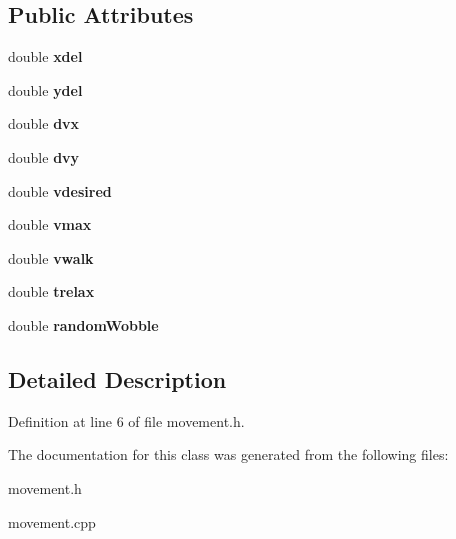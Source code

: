 \subsection*{Public Attributes}
\begin{DoxyCompactItemize}
\item 
\mbox{\label{classmovement_a1d4a21441baf4f59ceabb25e01957197}} 
double {\bfseries xdel}
\item 
\mbox{\label{classmovement_a8135db424da53103c601fbe265c4078e}} 
double {\bfseries ydel}
\item 
\mbox{\label{classmovement_a2ad6baf5e20f1b04169c355a3eaa7f4a}} 
double {\bfseries dvx}
\item 
\mbox{\label{classmovement_a14589ed0161d8d248e53421af0e282f8}} 
double {\bfseries dvy}
\item 
\mbox{\label{classmovement_acf8298233464d137777e8bf3c26a63b2}} 
double {\bfseries vdesired}
\item 
\mbox{\label{classmovement_aae56090ba1816d74c0a82840e5ee9713}} 
double {\bfseries vmax}
\item 
\mbox{\label{classmovement_a6b3db78fd7a26da3a9e6be691902525a}} 
double {\bfseries vwalk}
\item 
\mbox{\label{classmovement_a51035f46709076cf35eb010ba4ba135f}} 
double {\bfseries trelax}
\item 
\mbox{\label{classmovement_a959ef2b033665694fec3aec1b190b350}} 
double {\bfseries random\+Wobble}
\end{DoxyCompactItemize}


\subsection{Detailed Description}


Definition at line 6 of file movement.\+h.



The documentation for this class was generated from the following files\+:\begin{DoxyCompactItemize}
\item 
movement.\+h\item 
movement.\+cpp\end{DoxyCompactItemize}

